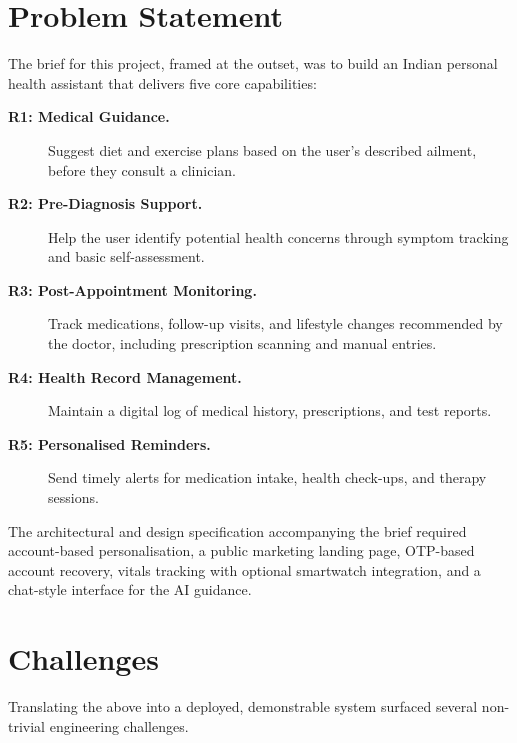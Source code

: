 \documentclass[12pt]{caltech_thesis}
\begin{document}
\section{Problem Statement}

The brief for this project, framed at the outset, was to build an Indian
personal health assistant that delivers five core capabilities:

\begin{description}
    \item[\textbf{R1: Medical Guidance.}] Suggest diet and exercise plans
    based on the user's described ailment, before they consult a clinician.
    \item[\textbf{R2: Pre-Diagnosis Support.}] Help the user identify
    potential health concerns through symptom tracking and basic
    self-assessment.
    \item[\textbf{R3: Post-Appointment Monitoring.}] Track medications,
    follow-up visits, and lifestyle changes recommended by the doctor,
    including prescription scanning and manual entries.
    \item[\textbf{R4: Health Record Management.}] Maintain a digital log of
    medical history, prescriptions, and test reports.
    \item[\textbf{R5: Personalised Reminders.}] Send timely alerts for
    medication intake, health check-ups, and therapy sessions.
\end{description}

The architectural and design specification accompanying the brief required
account-based personalisation, a public marketing landing page, OTP-based
account recovery, vitals tracking with optional smartwatch integration, and
a chat-style interface for the AI guidance.

\section{Challenges}

Translating the above into a deployed, demonstrable system surfaced several
non-trivial engineering challenges.
\end{document}
